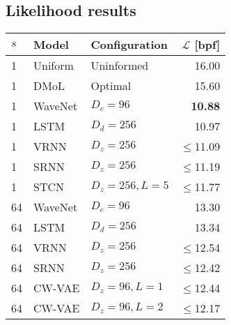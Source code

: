 \subsection{Likelihood results}
%
\begin{table}[t]
    \hspace{4mm}
    \begin{minipage}[t]{.45\textwidth}
    \centering
    \begin{adjustbox}{center, totalheight=0.35\paperheight}
    \begin{tabular}[t]{lll|r}
        \toprule
        $s$ & \bfseries Model         & \bfseries Configuration           & \bfseries $\mathcal{L}$ [bpf] \\
        \midrule
        1 & Uniform             & Uninformed                  & 16.00 \\
        1 & DMoL                & Optimal                     & 15.60 \\   %
        \midrule
        1 & WaveNet             & $D_c=96$                    & \textbf{10.88} \\  %
        1 & LSTM                & $D_d=256$                   & 10.97 \\  %
        1 & VRNN                & $D_z=256$                   & $\leq$11.09 \\  %
        1 & SRNN                & $D_z=256$                   & $\leq$11.19 \\  %
        1 & STCN                & $D_z=256,L=5$               & $\leq$11.77 \\  %
        \midrule
        64 & WaveNet            & $D_c=96$                    & 13.30 \\  %
        64 & LSTM               & $D_d=256$                   & 13.34 \\  %
        64 & VRNN               & $D_z=256$                   & $\leq$12.54 \\  %
        64 & SRNN               & $D_z=256$                   & $\leq$12.42 \\  %
        64 & CW-VAE             & $D_z=96,L=1$                & $\leq$12.44 \\
        64 & CW-VAE             & $D_z=96,L=2$                & $\leq$12.17 \\

\end{tabular}
\end{adjustbox}
\end{minipage}
\end{table}
